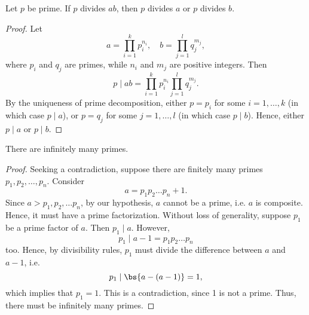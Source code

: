 \begin{lemma}
    Let $p$ be prime. If $p$ divides $ab$, then $p$ divides $a$ or $p$ divides $b$.
\end{lemma}
\begin{proof}
    Let \[a = \prod_{i = 1}^{k} p_i^{n_i}, \quad b = \prod_{j = 1}^{l} q_j^{m_j},\] where $p_i$ and $q_j$ are primes, while $n_i$ and $m_j$ are positive integers. Then \[p \mid ab = \prod_{i = 1}^{k} p_i^{n_i} \prod_{j = 1}^{l} q_j^{m_j}.\] By the uniqueness of prime decomposition, either $p = p_i$ for some $i = 1, \dots, k$ (in which case $p \mid a$), or $p = q_j$ for some $j = 1, \dots, l$ (in which case $p \mid b$). Hence, either $p \mid a$ or $p \mid b$.
\end{proof}

\begin{theorem}
    There are infinitely many primes.
\end{theorem}
\begin{proof}
    Seeking a contradiction, suppose there are finitely many primes $p_1, p_2, \dots, p_n$. Consider \[a = p_1 p_2 \dots p_n + 1.\] Since $a > p_1, p_2, \dots p_n$, by our hypothesis, $a$ cannot be a prime, i.e. $a$ is composite. Hence, it must have a prime factorization. Without loss of generality, suppose $p_1$ be a prime factor of $a$. Then $p_1 \mid a$. However, \[p_1 \mid a - 1 = p_1 p_2 \dots p_n\] too. Hence, by divisibility rules, $p_1$ must divide the difference between $a$ and $a-1$, i.e. \[p_1 \mid \bs{a - (a-1)} = 1,\] which implies that $p_1 = 1$. This is a contradiction, since 1 is not a prime. Thus, there must be infinitely many primes.
\end{proof}